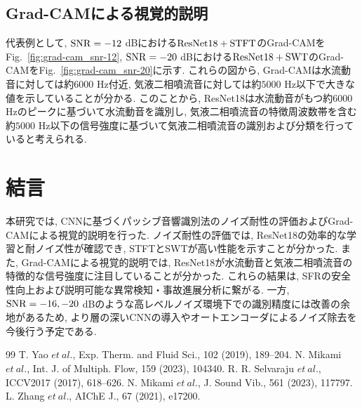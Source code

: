 \documentclass[10pt, fleqn, twocolumn]{jsarticle}
\begin{document}
\subsection{Grad-CAMによる視覚的説明}
代表例として, ${\rm SNR}=-12$ dBにおける$\rm ResNet18+STFT$のGrad-CAMをFig.~\ref{fig:grad-cam_snr-12}, ${\rm SNR}=-20$ dBにおける$\rm ResNet18+SWT$のGrad-CAMをFig.~\ref{fig:grad-cam_snr-20}に示す.
これらの図から, Grad-CAMは水流動音に対しては約6000 Hz付近, 気液二相噴流音に対しては約$5000$ Hz以下で大きな値を示していることが分かる.
このことから, ResNet18は水流動音がもつ約$6000$ Hzのピークに基づいて水流動音を識別し, 気液二相噴流音の特徴周波数帯を含む約$5000$ Hz以下の信号強度に基づいて気液二相噴流音の識別および分類を行っていると考えられる.

\section{結言}
本研究では, CNNに基づくパッシブ音響識別法のノイズ耐性の評価およびGrad-CAMによる視覚的説明を行った.
ノイズ耐性の評価では, ResNet18の効率的な学習と耐ノイズ性が確認でき, STFTとSWTが高い性能を示すことが分かった.
また, Grad-CAMによる視覚的説明では, ResNet18が水流動音と気液二相噴流音の特徴的な信号強度に注目していることが分かった.
これらの結果は, SFRの安全性向上および説明可能な異常検知・事故進展分析に繋がる.
一方, ${\rm SNR}=-16,-20$ dBのような高レベルノイズ環境下での識別精度には改善の余地があるため, より層の深いCNNの導入やオートエンコーダによるノイズ除去を今後行う予定である.


\begin{thebibliography}{99}
  \setlength{\itemsep}{-1pt}
   T. Yao $et~al.$, Exp. Therm. and Fluid Sci., 102 (2019), 189--204.
   N. Mikami $et~al.$, Int. J. of Multiph. Flow, 159 (2023), 104340.
   R. R. Selvaraju $et~al.$, ICCV2017 (2017), 618--626.
   N. Mikami $et~al.$, J. Sound Vib., 561 (2023), 117797.
   L. Zhang $et~al.$, AIChE J., 67 (2021), e17200.
  \end{thebibliography}
\end{document}
